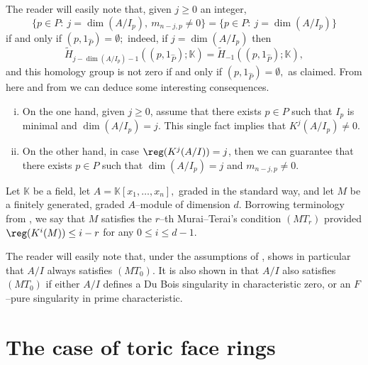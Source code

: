 \documentclass[11pt]{amsart}
\begin{document}
\begin{rk}
The reader will easily note that, given $j\geq 0$ an integer,
\[
\{p\in P:\ j=\dim (A/I_p),\ m_{n-j,p}\neq 0\}=\{p\in P:\ j=\dim (A/I_p)\}
\]
if and only if $(p,1_{\widehat{P}})=\emptyset;$ indeed, if $j=\dim (A/I_p)$ then
\[
\widetilde{H}_{j-\dim (A/I_p)-1}((p,1_{\widehat{P}});\mathbb{K})=\widetilde{H}_{-1}((p,1_{\widehat{P}});\mathbb{K}),
\]
and this homology group is not zero if and only if $(p,1_{\widehat{P}})=\emptyset,$ as claimed. From here and from  we can deduce some interesting consequences.

\begin{enumerate}[(i)]

\item On the one hand, given $j\geq 0$, assume that there exists $p\in P$ such that $I_p$ is minimal and $\dim (A/I_p)=j$. This single fact implies that $K^j (A/I_p)\neq 0$.

\item On the other hand, in case $\reg (K^j (A/I))=j$, then we can guarantee that there exists $p\in P$ such that $\dim (A/I_p)=j$ and $m_{n-j,p}\neq 0$.

\end{enumerate}
\end{rk}

\begin{rk}
Let $\mathbb{K}$ be a field, let $A=\mathbb{K}[x_1,\ldots,x_n],$ graded in the standard way, and let $M$ be a finitely generated, graded $A$--module of dimension $d$. Borrowing terminology from \cite[Definition 2.3]{DaoMaVarbaro}, we say that $M$ satisfies the $r$--th Murai--Terai's condition $(MT_r)$ provided $\reg (K^i (M))\leq i-r$ for any $0\leq i\leq d-1$.

The reader will easily note that, under the assumptions of ,  shows in particular that $A/I$ always satisfies $(MT_0)$. It is also shown in \cite[Propositions 3.1 and 4.1]{DaoMaVarbaro} that $A/I$ also satisfies $(MT_0)$ if either $A/I$ defines a Du Bois singularity in characteristic zero, or an $F$--pure singularity in prime characteristic.
\end{rk}

\section{The case of toric face rings}\label{section: the case of toric face rings}
\end{document}
